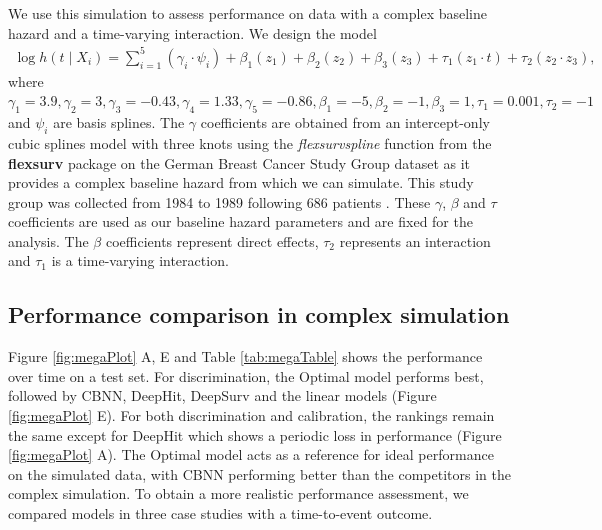 \documentclass[APA,LATO1COL]{WileyNJD-v2}
\begin{document}
We use this simulation to assess performance on data with a complex baseline hazard and a time-varying interaction. We design the model \begin{align}
\log h(t \mid X_i) =\sum_{i=1}^{5} (\gamma_{i} \cdot \psi_{i}) + \beta_{{1}} (z_{1}) + \beta_{{2}} (z_{2})+ \beta_{{3}} (z_{3})+ \tau_{1} ( z_{1} \cdot t)+ \tau_{2} (z_{2} \cdot z_{3}), \nonumber
\end{align} where
\(\gamma_{1}=3.9, \gamma_{2}=3, \gamma_{3}=-0.43, \gamma_{4}=1.33,\gamma_{5}=-0.86, \beta_{{1}}=-5, \beta_{{2}}=-1, \beta_{{3}}=1, \tau_{1}=0.001, \tau_{2}=-1\)
and \(\psi_{i}\) are basis splines. The \(\gamma\) coefficients are obtained from an intercept-only cubic splines model with three knots using the \emph{flexsurvspline}
function from the \textbf{flexsurv} package \citep{flexsurv} on the German Breast Cancer Study Group dataset as it provides a complex baseline hazard from which
we can simulate. This study group was collected from 1984 to 1989 following 686 patients \citep{royston2002flexible}. These $\gamma$, $\beta$ and $\tau$ coefficients are used
as our baseline hazard parameters and are fixed for the analysis. The \(\beta\) coefficients represent direct effects, \(\tau_{2}\) represents an interaction and
\(\tau_{1}\) is a time-varying interaction.

\hypertarget{performance-comparison-in-complex-simulation}{%
\subsection{Performance comparison in complex
simulation}\label{performance-comparison-in-complex-simulation}}


Figure \ref{fig:megaPlot} A, E and Table \ref{tab:megaTable} shows the performance over time on a test set. For discrimination, the Optimal model performs best,
followed by CBNN, DeepHit, DeepSurv and the linear models (Figure \ref{fig:megaPlot} E). For both discrimination and calibration, the rankings remain the same
except for DeepHit which shows a periodic loss in performance (Figure \ref{fig:megaPlot} A). The Optimal model acts as a reference for ideal performance on the
simulated data, with CBNN performing better than the competitors in the complex simulation. To obtain a more realistic performance assessment, we compared
models in three case studies with a time-to-event outcome.
\end{document}
